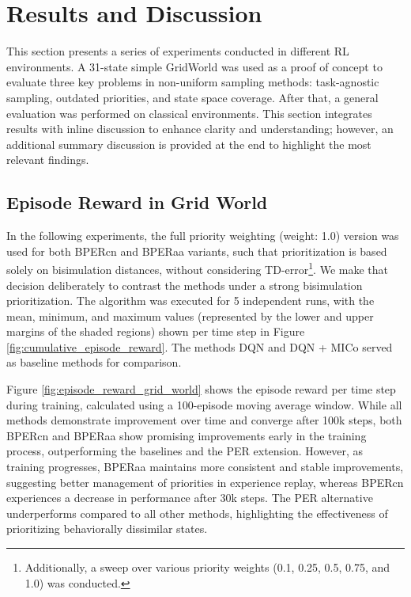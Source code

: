 
\chapter{Results and Discussion}

This section presents a series of experiments conducted in different RL environments. A 31-state simple GridWorld was used as a proof of concept to evaluate three key problems in non-uniform sampling methods: task-agnostic sampling, outdated priorities, and state space coverage. After that, a general evaluation was performed on classical environments. This section integrates results with inline discussion to enhance clarity and understanding; however, an additional summary discussion is provided at the end to highlight the most relevant findings.

\section{Episode Reward in Grid World}

In the following experiments, the full priority weighting (weight: 1.0) version was used for both BPERcn and BPERaa variants, such that prioritization is based solely on bisimulation distances, without considering TD-error\footnote{Additionally, a sweep over various priority weights (0.1, 0.25, 0.5, 0.75, and 1.0) was conducted.}. We make that decision deliberately to contrast the methods under a strong bisimulation prioritization. The algorithm was executed for 5 independent runs, with the mean, minimum, and maximum values (represented by the lower and upper margins of the shaded regions) shown per time step in Figure \ref{fig:cumulative_episode_reward}. The methods DQN and DQN + MICo served as baseline methods for comparison.

Figure \ref{fig:episode_reward_grid_world} shows the episode reward per time step during training, calculated using a 100-episode moving average window. While all methods demonstrate improvement over time and converge after 100k steps, both BPERcn and BPERaa show promising improvements early in the training process, outperforming the baselines and the PER extension. However, as training progresses, BPERaa maintains more consistent and stable improvements, suggesting better management of priorities in experience replay, whereas BPERcn experiences a decrease in performance after 30k steps. The PER alternative underperforms compared to all other methods, highlighting the effectiveness of prioritizing behaviorally dissimilar states.

